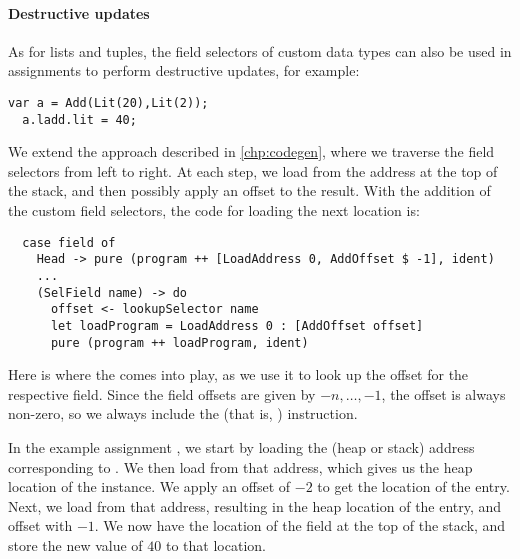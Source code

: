 \paragraph{Destructive updates}
As for lists and tuples, the field selectors of custom data types can also be
used in assignments to perform destructive updates, for example:
\begin{lstlisting}[language=SPL]
  var a = Add(Lit(20),Lit(2));
  a.ladd.lit = 40;
\end{lstlisting}
%
We extend the approach described in \cref{chp:codegen},
where we traverse the field selectors from left to right.
At each step, we load from the address at the top of the stack, and then
possibly apply an offset to the result.
With the addition of the custom field selectors, the code for loading the next
location is:
\begin{verbatim}
  case field of
    Head -> pure (program ++ [LoadAddress 0, AddOffset $ -1], ident)
    ...
    (SelField name) -> do
      offset <- lookupSelector name
      let loadProgram = LoadAddress 0 : [AddOffset offset]
      pure (program ++ loadProgram, ident)
\end{verbatim}

Here is where the  comes into play, as we use it to look up
the offset for the respective field. Since the field offsets are given by
$-n,\dots,-1$, the offset is always non-zero, so we always include the
 (that is, ) instruction.

In the example assignment , we start by loading the
(heap or stack) address corresponding to . We then load from that
address, which gives us the heap location of the  instance. We apply an
offset of $-2$ to get the location of the  entry.
Next, we load from that address, resulting in the heap location of the 
entry, and offset with $-1$. We now have the location of the  field at
the top of the stack, and store the new value of $40$ to that location.




